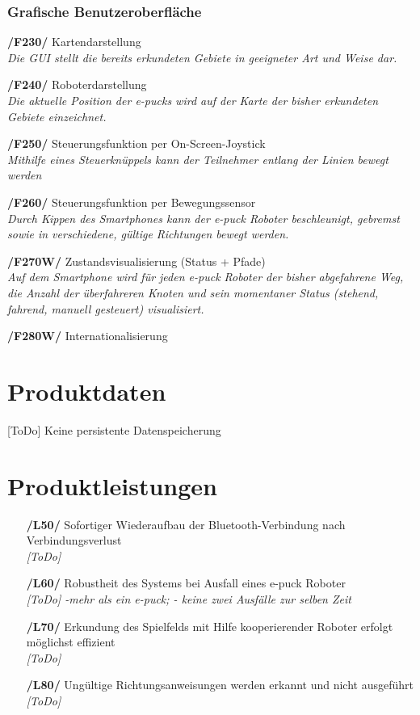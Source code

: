\documentclass[10pt,a4paper]{article}
\begin{document}
			\subsubsection{Grafische Benutzeroberfläche}
				\begin{list}{}{\leftmargin=1cm}
					\item[\textbf{/F230/}] Kartendarstellung
						\\ \textsl{Die GUI stellt die bereits erkundeten Gebiete in geeigneter Art und Weise dar.}	
					\item[\textbf{/F240/}] Roboterdarstellung
						\\ \textsl{Die aktuelle Position der e-pucks wird auf der Karte der bisher erkundeten Gebiete
							einzeichnet.}	
					\item[\textbf{/F250/}] Steuerungsfunktion per On-Screen-Joystick
						\\ \textsl{Mithilfe eines Steuerknüppels kann der Teilnehmer entlang der Linien bewegt werden}
					\item[\textbf{/F260/}] Steuerungsfunktion per Bewegungssensor	
						\\ \textsl{Durch Kippen des Smartphones kann der e-puck Roboter beschleunigt, gebremst sowie in verschiedene, gültige
							Richtungen bewegt werden.}
					\item[\textbf{/F270W/}] Zustandsvisualisierung (Status + Pfade)		
						\\ \textsl{Auf dem Smartphone wird für jeden e-puck Roboter der bisher abgefahrene Weg, die Anzahl der überfahreren
							Knoten und sein momentaner Status (stehend, fahrend, manuell gesteuert) visualisiert.}
					\item[\textbf{/F280W/}] Internationalisierung	
						\\ \textsl{}
				\end{list}
				
	\section{Produktdaten}
		[ToDo] Keine persistente Datenspeicherung
		
	\section{Produktleistungen}
		\begin{itemize}
			\item[\textbf{/L50/}] Sofortiger Wiederaufbau der Bluetooth-Verbindung nach Verbindungsverlust
				\\ \textsl{[ToDo]}
			\item[\textbf{/L60/}] Robustheit des Systems bei Ausfall eines e-puck Roboter
				\\ \textsl{[ToDo] -mehr als ein e-puck; - keine zwei Ausfälle zur selben Zeit}
			\item[\textbf{/L70/}] Erkundung des Spielfelds mit Hilfe kooperierender Roboter erfolgt möglichst effizient
				\\ \textsl{[ToDo]}						
			\item[\textbf{/L80/}] Ungültige Richtungsanweisungen werden erkannt und nicht ausgeführt 
				\\ \textsl{[ToDo]}					
		\end{itemize}						
\end{document}
